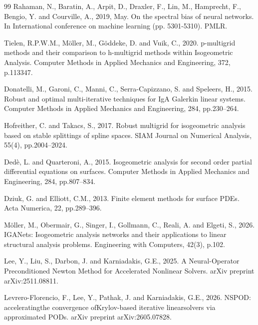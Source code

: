 \documentclass{article}
\theoremstyle{plain}
\numberwithin{equation}{section}
\begin{document}
\begin{thebibliography}{99}
    Rahaman, N., Baratin, A., Arpit, D., Draxler, F., Lin, M., Hamprecht, F., Bengio, Y. and Courville, A., 2019, May. On the spectral bias of neural networks. In International conference on machine learning (pp. 5301-5310). PMLR.

    Tielen, R.P.W.M., Möller, M., Göddeke, D. and Vuik, C., 2020. p-multigrid methods and their comparison to h-multigrid methods within Isogeometric Analysis. Computer Methods in Applied Mechanics and Engineering, 372, p.113347.

    Donatelli, M., Garoni, C., Manni, C., Serra-Capizzano, S. and Speleers, H., 2015. Robust and optimal multi-iterative techniques for IgA Galerkin linear systems. Computer Methods in Applied Mechanics and Engineering, 284, pp.230--264.

    Hofreither, C. and Takacs, S., 2017. Robust multigrid for isogeometric analysis based on stable splittings of spline spaces. SIAM Journal on Numerical Analysis, 55(4), pp.2004--2024.

    Dedè, L. and Quarteroni, A., 2015. Isogeometric analysis for second order partial differential equations on surfaces. Computer Methods in Applied Mechanics and Engineering, 284, pp.807--834.

    Dziuk, G. and Elliott, C.M., 2013. Finite element methods for surface PDEs. Acta Numerica, 22, pp.289--396.

    Möller, M., Obermair, G., Singer, I., Gollmann, C., Reali, A. and Elgeti, S., 2026. IGANets: Isogeometric analysis networks and their applications to linear structural analysis problems. Engineering with Computers, 42(3), p.102.

    Lee, Y., Liu, S., Darbon, J. and Karniadakis, G.E., 2025. A Neural-Operator Preconditioned Newton Method for Accelerated Nonlinear Solvers. arXiv preprint arXiv:2511.08811.

    Levrero-Florencio, F., Lee, Y., Pathak, J. and Karniadakis, G.E., 2026. NSPOD: acceleratingthe convergence ofKrylov-based iterative linearsolvers via approximated PODs. arXiv preprint arXiv:2605.07828.

\end{thebibliography}
\end{document}
